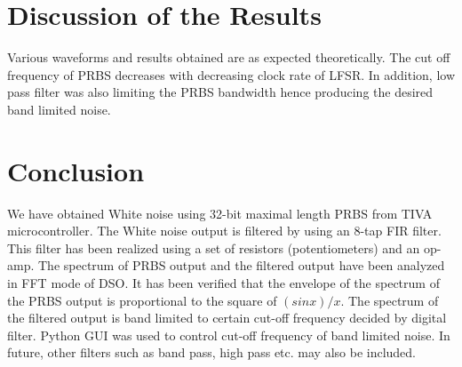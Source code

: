 \documentclass[a4paper,12pt]{article}
\begin{document}
\newpage	
\section{Discussion of the Results}
Various waveforms and results obtained are as expected theoretically. The cut off frequency of PRBS decreases with decreasing clock rate of LFSR. In addition, low pass filter was also limiting the PRBS bandwidth hence producing the desired band limited noise.  

\section{Conclusion}
We have obtained White noise using 32-bit maximal length PRBS from TIVA microcontroller. The White noise output is filtered by using an 8-tap FIR filter. This filter has been realized using a set of resistors (potentiometers) and an op-amp. The spectrum of PRBS output and the filtered output have been analyzed in FFT mode of DSO. It has been verified that the envelope of the spectrum of the PRBS output is proportional to the square of $(sin x)/x$. The spectrum of the filtered output is band limited to certain cut-off frequency decided by digital filter. Python GUI was used to control cut-off frequency of band limited noise. In future, other filters such as band pass, high pass etc. may also be included.




\end{document}
